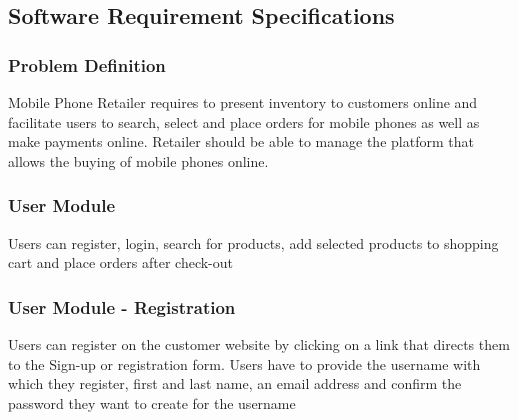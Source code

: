 \documentclass[hidelinks,a4paper,12pt]{article}
\begin{document}
\subsection{\Gls{Software Requirement Specifications}}

\subsubsection{Problem Definition}
Mobile Phone Retailer requires to present inventory to customers online and facilitate users to search, select and place orders for mobile phones as well as make payments online.
Retailer should be able to manage the platform that allows the buying of mobile phones online.

\subsubsection{User Module}
Users can register, login, search for products, add selected products to shopping cart and place orders after check-out

\subsubsection{User Module - Registration}
Users can register on the customer website by clicking on a link that directs them to the Sign-up or registration form. Users have to provide the username with which they register, first and last name, an email address and confirm the password they want to create for the username
\end{document}
